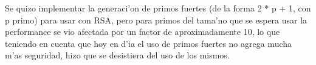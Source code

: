 Se quizo implementar la generaci'on de primos fuertes (de la forma 2 * p + 1, con p primo) para usar con RSA, pero para primos del tama'no que se espera usar la performance se vio afectada por un factor de aproximadamente 10, lo que teniendo en cuenta que hoy en d'ia el uso de primos fuertes no agrega mucha m'as seguridad, hizo que se desistiera del uso de los mismos.